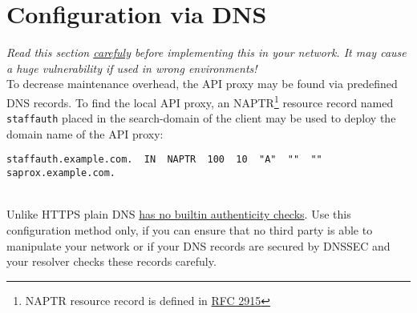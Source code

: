 %
%
%
%
%
%
%


\section{Configuration via DNS}

\textit{Read this section \underline{carefuly} before implementing this in your
network. It may cause a huge vulnerability if used in wrong environments!} \\

To decrease maintenance overhead, the API proxy may be found via predefined DNS
records. To find the local API proxy, an NAPTR\footnote{NAPTR resource record is
defined in \href{https://tools.ietf.org/html/rfc2915}{RFC 2915}} resource record
named \verb+staffauth+ placed in the search-domain of the client may be used to
deploy the domain name of the API proxy: \\

\begin{lstlisting}[language=none, numbers=none]
staffauth.example.com.  IN  NAPTR  100  10  "A"  ""  ""  saprox.example.com.
\end{lstlisting}

~\\

Unlike HTTPS plain DNS \underline{has no builtin authenticity checks}.
Use this configuration method only, if you can ensure that no third party is
able to manipulate your network or if your DNS records are secured by
DNSSEC and your resolver checks these records carefuly.
